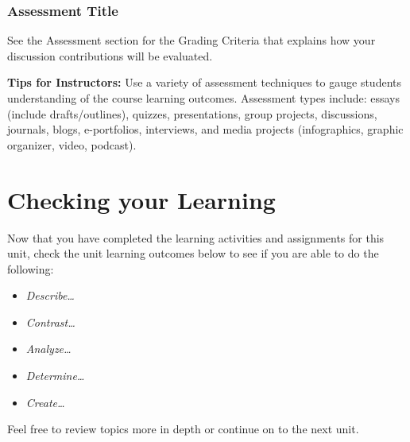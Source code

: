 \documentclass[
]{book}
\providecommand{\tightlist}{%
  \setlength{\itemsep}{0pt}\setlength{\parskip}{0pt}}
\begin{document}
\begin{assessment}
\hypertarget{assessment-title}{%
\subsubsection*{Assessment Title}\label{assessment-title}}

See the Assessment section for the Grading Criteria that explains how
your discussion contributions will be evaluated.
\end{assessment}

\begin{feedback}
\textbf{Tips for Instructors:} Use a variety of assessment techniques to
gauge students understanding of the course learning outcomes. Assessment
types include: essays (include drafts/outlines), quizzes, presentations,
group projects, discussions, journals, blogs, e-portfolios, interviews,
and media projects (infographics, graphic organizer, video, podcast).
\end{feedback}

\hypertarget{checking-your-learning}{%
\section*{Checking your Learning}\label{checking-your-learning}}

\begin{progress}
Now that you have completed the learning activities and assignments for
this unit, check the unit learning outcomes below to see if you are able
to do the following:

\begin{itemize}
\tightlist
\item
  \emph{Describe\ldots{}}\\
\item
  \emph{Contrast\ldots{}}\\
\item
  \emph{Analyze\ldots{}}\\
\item
  \emph{Determine\ldots{}}\\
\item
  \emph{Create\ldots{}}
\end{itemize}

Feel free to review topics more in depth or continue on to the next
unit.
\end{progress}
\end{document}
